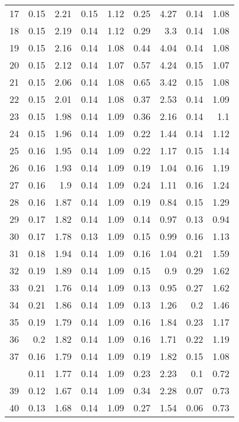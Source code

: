 \begin{longtable}{crrrrrrrr}
		17&0.15&2.21&0.15&1.12&0.25&4.27&0.14&1.08\\ 
		18&0.15&2.19&0.14&1.12&0.29&3.3&0.14&1.08\\ 
		19&0.15&2.16&0.14&1.08&0.44&4.04&0.14&1.08\\
		20&0.15&2.12&0.14&1.07&0.57&4.24&0.15&1.07\\
		21&0.15&2.06&0.14&1.08&0.65&3.42&0.15&1.08\\
		22&0.15&2.01&0.14&1.08&0.37&2.53&0.14&1.09\\
		23&0.15&1.98&0.14&1.09&0.36&2.16&0.14&1.1\\
		24&0.15&1.96&0.14&1.09&0.22&1.44&0.14&1.12\\
		25&0.16&1.95&0.14&1.09&0.22&1.17&0.15&1.14\\
		26&0.16&1.93&0.14&1.09&0.19&1.04&0.16&1.19\\
		27&0.16&1.9&0.14&1.09&0.24&1.11&0.16&1.24\\
		28&0.16&1.87&0.14&1.09&0.19&0.84&0.15&1.29\\
		29&0.17&1.82&0.14&1.09&0.14&0.97&0.13&0.94\\
		30&0.17&1.78&0.13&1.09&0.15&0.99&0.16&1.13\\
		31&0.18&1.94&0.14&1.09&0.16&1.04&0.21&1.59\\ 
		32&0.19&1.89&0.14&1.09&0.15&0.9&0.29&1.62\\
		33&0.21&1.76&0.14&1.09&0.13&0.95&0.27&1.62\\
		34&0.21&1.86&0.14&1.09&0.13&1.26&0.2&1.46\\  
		35&0.19&1.79&0.14&1.09&0.16&1.84&0.23&1.17\\ 
		36&0.2&1.82&0.14&1.09&0.16&1.71&0.22&1.19\\
		37&0.16&1.79&0.14&1.09&0.19&1.82&0.15&1.08\\  \clearpage
		38&0.11&1.77&0.14&1.09&0.23&2.23&0.1&0.72\\
		39&0.12&1.67&0.14&1.09&0.34&2.28&0.07&0.73\\
		40&0.13&1.68&0.14&1.09&0.27&1.54&0.06&0.73\\
		\bottomrule
	\end{longtable}
